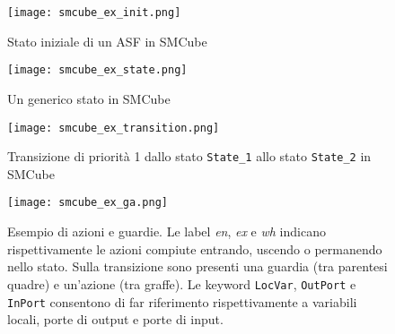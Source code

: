 \begin{figure}
\centering
\texttt{[image: smcube\_ex\_init.png]}
\caption{Stato iniziale di un ASF in SMCube}
\label{Fig:smcube_ex_init}
\end{figure}

\begin{figure}
\centering
\texttt{[image: smcube\_ex\_state.png]}
\caption{Un generico stato in SMCube}
\label{Fig:smcube_ex_state}
\end{figure}

\begin{figure}
\centering
\texttt{[image: smcube\_ex\_transition.png]}
\caption{Transizione di priorità 1 dallo stato \texttt{State\_1} allo stato \texttt{State\_2} in SMCube}
\label{Fig:smcube_ex_transition}
\end{figure}

\begin{figure}
\centering
\texttt{[image: smcube\_ex\_ga.png]}
\caption{Esempio di azioni e guardie. Le label \textit{en}, \textit{ex} e \textit{wh} indicano rispettivamente le azioni compiute entrando, uscendo o permanendo nello stato. Sulla transizione sono presenti una guardia (tra parentesi quadre) e un'azione (tra graffe). Le keyword \texttt{LocVar}, \texttt{OutPort} e \texttt{InPort} consentono di far riferimento rispettivamente a variabili locali, porte di output e porte di input.}
\label{Fig:smcube_ex_ga}
\end{figure}